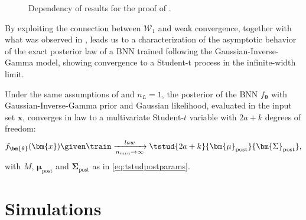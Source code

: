 \begin{figure}[H]
\begin{centering}
{}
		\caption{Dependency of results for the proof of .}
		\label{fig:chartmain}
	\end{centering}
\end{figure}

By exploiting the connection between $\mathcal{W}_1$ and weak convergence, together with what was observed in ,  leads us to a characterization of the asymptotic behavior of the exact posterior law of a BNN trained following the Gaussian-Inverse-Gamma model, showing convergence to a Student-t process in the infinite-width limit.

\begin{corollary} \label{cor:studposterior}
    Under the same assumptions of  and $n_L = 1$, the posterior of the BNN $f_{\bm{\theta}}$ with Gaussian-Inverse-Gamma prior and Gaussian likelihood, evaluated in the input set $\bm{x}$, converges in law to a multivariate Student-$t$ variable with $2a+k$ degrees of freedom:
    \begin{equation*}
        f_{\bm{\theta}}(\bm{x}) \given \train \xrightarrow[n_{min} \to \infty]{law} \tstud{2a + k}{\bm{\mu}_{\mathrm{post}}}{\bm{\Sigma}_{\mathrm{post}}},
    \end{equation*}
    with $M$, $\bm{\mu}_{\mathrm{post}}$ and $\bm{\Sigma}_{\mathrm{post}}$ as in \cref{eq:tstudpostparams}.
\end{corollary}

\section{Simulations} \label{sec:simulations}

